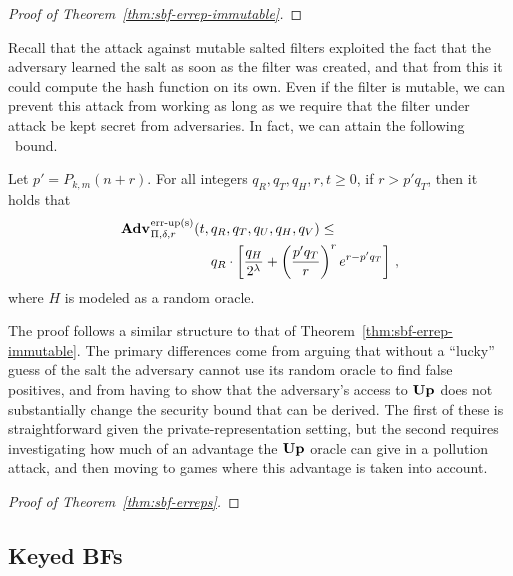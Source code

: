 \begin{proof}[Proof of Theorem~\ref{thm:sbf-errep-immutable}]
  
\end{proof}


Recall that the attack against mutable salted filters exploited the fact that
the adversary learned the salt as soon as the filter was created, and that from
this it could compute the hash function on its own. Even if the filter is
mutable, we can prevent this attack from working as long as we require that the
filter under attack be kept secret from adversaries. In fact, we can attain the
following \erreps\ bound.

\begin{theorem}\label{thm:sbf-erreps}
  Let $p' = P_{k,m}(n+r)$.
  For all integers $q_R, q_T, q_H, r, t \geq 0$, if
  $r > p'q_T$, then it holds that
  \begin{eqnarray*}
    \begin{aligned}
      \Adv{\erreps}_{\Pi,\delta,r}(t,\,&q_R, q_T, q_U, q_H, q_V) \leq \\
          & q_R \cdot \left[
      \frac{q_H}{2^\lambda} +
      \left(\frac{p'q_T}{r}\right)^re^{r-p'q_T}\right]\,,
    \end{aligned}
\end{eqnarray*}
  where $H$ is modeled as a random oracle.
\end{theorem}

The proof follows a similar structure to that of
Theorem~\ref{thm:sbf-errep-immutable}. The primary differences come from arguing
that without a ``lucky'' guess of the salt the adversary cannot use its random
oracle to find false positives, and from having to show that the adversary's
access to $\textup{\textbf{Up}}\hspace{0.5pt}$ does not substantially change the security bound that can be
derived. The first of these is straightforward given the private-representation
setting, but the second requires investigating how much of an advantage the
$\textup{\textbf{Up}}\hspace{0.5pt}$ oracle can give in a pollution attack, and then moving to games where
this advantage is taken into account.

\begin{proof}[Proof of Theorem~\ref{thm:sbf-erreps}]
  
\end{proof}

\subsection{Keyed BFs}

